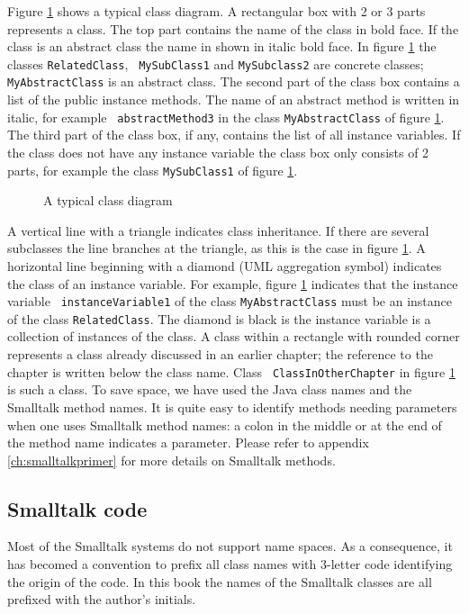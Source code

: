 \documentclass[twoside]{book}
\begin{document}
Figure \ref{fig:classDiagram} shows a typical class diagram. A
rectangular box with 2 or 3 parts represents a class. The top part
contains the name of the class in bold face. If the class is an
abstract class the name in shown in italic bold face. In figure
\ref{fig:classDiagram} the classes {\tt RelatedClass}, {\tt
MySubClass1} and {\tt MySubclass2} are concrete classes; {\tt
MyAbstractClass} is an abstract class. The second part of the
class box contains a list of the public instance methods. The name
of an abstract method is written in italic, for example {\tt
abstractMethod3} in the class {\tt MyAbstractClass} of figure
\ref{fig:classDiagram}. The third part of the class box, if any,
contains the list of all instance variables. If the class does not
have any instance variable the class box only consists of 2 parts,
for example the class {\tt MySubClass1} of figure
\ref{fig:classDiagram}.
\begin{figure}
\center{}
\caption{A typical class diagram} \label{fig:classDiagram}
\end{figure}

A vertical line with a triangle indicates class inheritance. If
there are several subclasses the line branches at the triangle, as
this is the case in figure \ref{fig:classDiagram}. A horizontal
line beginning with a diamond (UML aggregation symbol) indicates
the class of an instance variable. For example, figure
\ref{fig:classDiagram} indicates that the instance variable {\tt
instanceVariable1} of the class {\tt MyAbstractClass} must be an
instance of the class {\tt RelatedClass}. The diamond is black is
the instance variable is a collection of instances of the class. A
class within a rectangle with rounded corner represents a class
already discussed in an earlier chapter; the reference to the
chapter is written below the class name. Class {\tt
ClassInOtherChapter} in figure \ref{fig:classDiagram} is such a
class. To save space, we have used the Java class names and the
Smalltalk method names. It is quite easy to identify methods
needing parameters when one uses Smalltalk method names: a
colon in the middle or at the end of the method name indicates
a parameter. Please refer to appendix \ref{ch:smalltalkprimer} for
more details on Smalltalk methods.

\subsection{Smalltalk code}
Most of the Smalltalk systems do not support name spaces. As a
consequence, it has becomed a convention to prefix all class names
with 3-letter code identifying the origin of the code. In this
book the names of the Smalltalk classes are all prefixed with the
author's initials.
\end{document}
